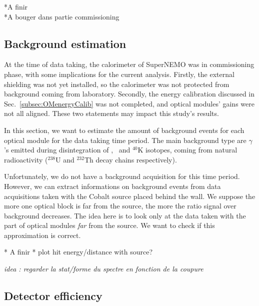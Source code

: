 *A finir\\
*A bouger dans partie commissioning


\subsection{Background estimation}
\label{subsec:bkg_estimation}

At the time of data taking, the calorimeter of SuperNEMO was in commissioning phase, with some implications for the current analysis.
Firstly, the external shielding was not yet installed, so the calorimeter was not protected from background coming from laboratory.
Secondly, the energy calibration discussed in Sec.~\ref{subsec:OMenergyCalib} was not completed, and optical modules' gains were not all aligned.
These two statements may impact this study's results.

In this section, we want to estimate the amount of background events for each optical module for the data taking time period.
The main background type are $\gamma$'s emitted during disintegration of \Tl , \Bi\ and $^{40}$K isotopes, coming from natural radioactivity ($^{238}$U and $^{232}$Th decay chains respectively).

Unfortunately, we do not have a background acquisition for this time period.
However, we can extract informations on background events from data acquisitions taken with the Cobalt source placed behind the wall.
We suppose the more one optical block is far from the source, the more the ratio signal over background decreases.
The idea here is to look only at the data taken with the part of optical modules \emph{far} from the source.
We want to check if this approximation is correct.

* A finir *
plot hit energy/distance with source?

\emph{idea : regarder la stat/forme du spectre en fonction de la coupure}

\subsection{Detector efficiency}
\label{subsec:detector_efficiency}

